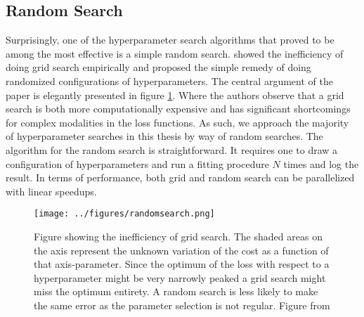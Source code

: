 \subsection{Random Search}
Surprisingly, one of the hyperparameter search algorithms that proved to be among the most effective is a simple random search. \citet{Bergstra2012} showed the inefficiency of doing grid search empirically and proposed the simple remedy of doing randomized configurations of hyperparameters. The central argument of the paper is elegantly presented in figure \ref{fig:randomsearch}. Where the authors observe that a grid search is both more computationally expensive and has significant shortcomings for complex modalities in the loss functions. As such, we approach the majority of hyperparameter searches in this thesis by way of random searches. The algorithm for the random search is straightforward. It requires one to draw a configuration of hyperparameters and run a fitting procedure $N$ times and log the result. In terms of performance, both grid and random search can be parallelized with linear speedups. 

\begin{figure}[ht]
\centering
\hspace{-0.5cm}
\texttt{[image: ../figures/randomsearch.png]}
\caption[Illustrating why randomsearch works]{Figure showing the inefficiency of grid search. The shaded areas on the axis represent the unknown variation of the cost as a function of that axis-parameter. Since the optimum of the loss with respect to a hyperparameter might be very narrowly peaked a grid search might miss the optimum entirety.  A random search is less likely to make the same error as the parameter selection is not regular. Figure from \citet{Bergstra2012}}\label{fig:randomsearch}
\end{figure} 
